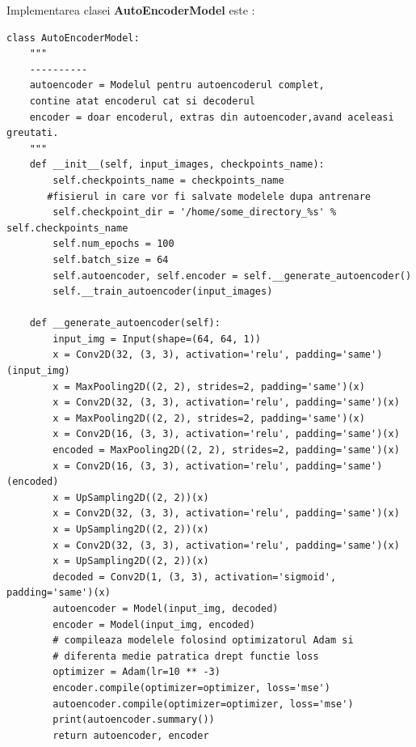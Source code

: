 \documentclass[a4paper,12pt]{report}
\begin{document}
Implementarea clasei \textbf{AutoEncoderModel} este : 
\begin{footnotesize}
\begin{lstlisting}
class AutoEncoderModel:
    """
    ----------
    autoencoder = Modelul pentru autoencoderul complet, 
    contine atat encoderul cat si decoderul
    encoder = doar encoderul, extras din autoencoder,avand aceleasi greutati.
    """
    def __init__(self, input_images, checkpoints_name):
        self.checkpoints_name = checkpoints_name
       #fisierul in care vor fi salvate modelele dupa antrenare
        self.checkpoint_dir = '/home/some_directory_%s' % self.checkpoints_name
        self.num_epochs = 100
        self.batch_size = 64
        self.autoencoder, self.encoder = self.__generate_autoencoder()
        self.__train_autoencoder(input_images)

    def __generate_autoencoder(self):
        input_img = Input(shape=(64, 64, 1))
        x = Conv2D(32, (3, 3), activation='relu', padding='same')(input_img)
        x = MaxPooling2D((2, 2), strides=2, padding='same')(x)
        x = Conv2D(32, (3, 3), activation='relu', padding='same')(x)
        x = MaxPooling2D((2, 2), strides=2, padding='same')(x)
        x = Conv2D(16, (3, 3), activation='relu', padding='same')(x)
        encoded = MaxPooling2D((2, 2), strides=2, padding='same')(x)
        x = Conv2D(16, (3, 3), activation='relu', padding='same')(encoded)
        x = UpSampling2D((2, 2))(x)
        x = Conv2D(32, (3, 3), activation='relu', padding='same')(x)
        x = UpSampling2D((2, 2))(x)
        x = Conv2D(32, (3, 3), activation='relu', padding='same')(x)
        x = UpSampling2D((2, 2))(x)
        decoded = Conv2D(1, (3, 3), activation='sigmoid', padding='same')(x)
        autoencoder = Model(input_img, decoded)
        encoder = Model(input_img, encoded)
        # compileaza modelele folosind optimizatorul Adam si 
        # diferenta medie patratica drept functie loss
        optimizer = Adam(lr=10 ** -3)
        encoder.compile(optimizer=optimizer, loss='mse')
        autoencoder.compile(optimizer=optimizer, loss='mse')
        print(autoencoder.summary())
        return autoencoder, encoder


\end{lstlisting}
\end{footnotesize}
\end{document}
